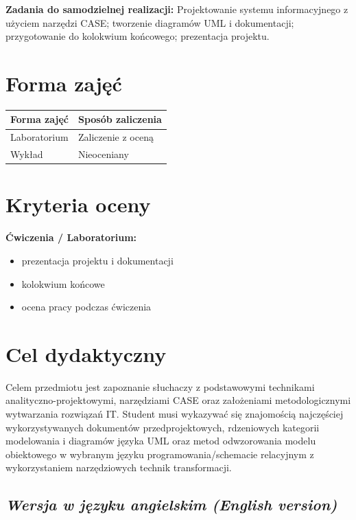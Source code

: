 \documentclass[12pt, a4paper]{article}
\newcommand{\thdrule}{\noalign{\global\setlength{\extrarowheight}{0pt}}}
\newcommand{\thdend}{\noalign{\global\setlength{\extrarowheight}{3pt}}}
\begin{document}
\vspace{4pt}
\noindent\textbf{Zadania do samodzielnej realizacji:} Projektowanie systemu informacyjnego z użyciem narzędzi CASE; tworzenie diagramów UML i dokumentacji; przygotowanie do kolokwium końcowego; prezentacja projektu.

\section{Forma zajęć}

\begin{center}
{\scriptsize
\begin{tabular}{m{5cm}m{8cm}}
\thdrule\toprule
\rowcolor{pjatkRed} {\color{white}\textbf{Forma zajęć}} & {\color{white}\textbf{Sposób zaliczenia}} \\
\midrule\thdend
  \rowcolor{tableRowLight} Laboratorium & Zaliczenie z oceną \\
  \rowcolor{tableRowAlt} Wykład & Nieoceniany \\
\bottomrule
\end{tabular}}
\end{center}

\section{Kryteria oceny}

\textbf{Ćwiczenia / Laboratorium:}
\begin{itemize}
  \item prezentacja projektu i dokumentacji
  \item kolokwium końcowe
  \item ocena pracy podczas ćwiczenia
\end{itemize}


\section{Cel dydaktyczny}

Celem przedmiotu jest zapoznanie słuchaczy z podstawowymi technikami analityczno-projektowymi, narzędziami CASE oraz założeniami metodologicznymi wytwarzania rozwiązań IT. Student musi wykazywać się znajomością najczęściej wykorzystywanych dokumentów przedprojektowych, rdzeniowych kategorii modelowania i diagramów języka UML oraz metod odwzorowania modelu obiektowego w wybranym języku programowania/schemacie relacyjnym z wykorzystaniem narzędziowych technik transformacji.

\subsection*{\textit{Wersja w języku angielskim (English version)}}
\end{document}
